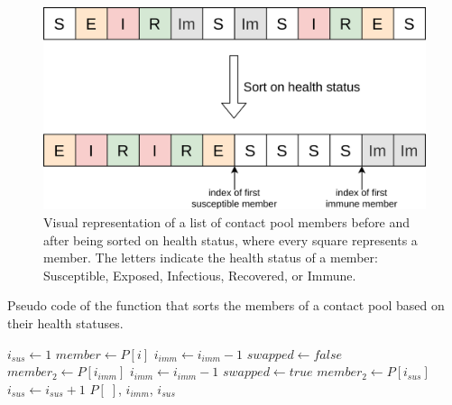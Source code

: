 \begin{figure}
    \centering
    \includegraphics[width=.8\textwidth]{3 - Stride/fig/health_sort.png}
    \caption{Visual representation of a list of contact pool members before and after being sorted on health status, where every square represents a member. The letters indicate the health status of a member: Susceptible, Exposed, Infectious, Recovered, or Immune.}
    \label{fig:health_sort}
\end{figure}

\begin{algorithm}
\caption{Pseudo code of the function that sorts the members of a contact pool based on their health statuses.}
\label{alg:health_sorting}
\begin{algorithmic}[1]
     \;
    \Statex
    \State $i_{sus} \gets 1$
        \State $member \gets P[i]$
            \State $i_{imm} \gets i_{imm}-1$
            \State $swapped \gets false$
                \State $member_{2} \gets P[i_{imm}]$
                    \State $i_{imm} \gets i_{imm}-1$
                \Else
                    \State {}
                    \State $swapped \gets true$
                \EndIf
            \EndWhile
        \Statex
                \State $member_{2} \gets P[i_{sus}]$
                \State {}
            \EndIf
            \State $i_{sus} \gets i_{sus}+1$
        \EndIf
    \EndFor
    \State \Return $P[\;]$, $i_{imm}$, $i_{sus}$
\end{algorithmic}
\end{algorithm}

